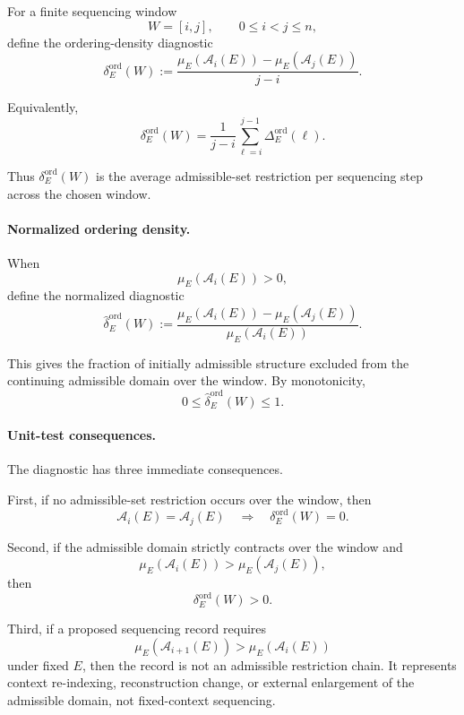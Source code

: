 \documentclass[aps,prx,onecolumn,11pt]{revtex4-2}
\theoremstyle{plain}
\theoremstyle{definition}
\theoremstyle{remark}
\begin{document}
For a finite sequencing window
\[
W=[i,j],
\qquad
0\leq i<j\leq n,
\]
define the ordering-density diagnostic
\begin{equation}
\delta_E^{\mathrm{ord}}(W)
:=
\frac{
\mu_E\!\left(\mathcal A_i(E)\right)
-
\mu_E\!\left(\mathcal A_j(E)\right)
}{
j-i
}.
\label{eq:ordering_density_window}
\end{equation}

Equivalently,
\[
\delta_E^{\mathrm{ord}}(W)
=
\frac{1}{j-i}
\sum_{\ell=i}^{j-1}
\Delta_E^{\mathrm{ord}}(\ell).
\]

Thus \(\delta_E^{\mathrm{ord}}(W)\) is the average admissible-set
restriction per sequencing step across the chosen window.

\paragraph{Normalized ordering density.}

When
\[
\mu_E(\mathcal A_i(E))>0,
\]
define the normalized diagnostic
\begin{equation}
\widehat{\delta}_E^{\mathrm{ord}}(W)
:=
\frac{
\mu_E\!\left(\mathcal A_i(E)\right)
-
\mu_E\!\left(\mathcal A_j(E)\right)
}{
\mu_E\!\left(\mathcal A_i(E)\right)
}.
\label{eq:ordering_density_normalized}
\end{equation}

This gives the fraction of initially admissible structure excluded from
the continuing admissible domain over the window. By monotonicity,
\[
0
\leq
\widehat{\delta}_E^{\mathrm{ord}}(W)
\leq
1.
\]

\paragraph{Unit-test consequences.}

The diagnostic has three immediate consequences.

First, if no admissible-set restriction occurs over the window, then
\[
\mathcal A_i(E)=\mathcal A_j(E)
\quad\Longrightarrow\quad
\delta_E^{\mathrm{ord}}(W)=0.
\]

Second, if the admissible domain strictly contracts over the window and
\[
\mu_E\!\left(\mathcal A_i(E)\right)
>
\mu_E\!\left(\mathcal A_j(E)\right),
\]
then
\[
\delta_E^{\mathrm{ord}}(W)>0.
\]

Third, if a proposed sequencing record requires
\[
\mu_E\!\left(\mathcal A_{i+1}(E)\right)
>
\mu_E\!\left(\mathcal A_i(E)\right)
\]
under fixed \(E\), then the record is not an admissible restriction
chain. It represents context re-indexing, reconstruction change, or
external enlargement of the admissible domain, not fixed-context
sequencing.
\end{document}
